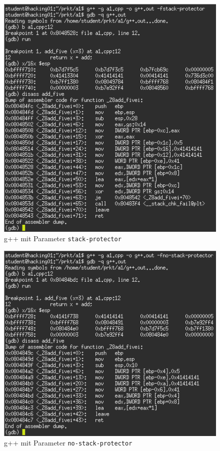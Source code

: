 \documentclass[11pt,a4paper]{article}
\begin{document}
\begin{figure}[h!]
  \caption{g++ mit Parameter \texttt{stack-protector}}
  \label{gpp0}
  \centering
    \includegraphics[scale=0.5]{2_gpp_protector_0.png}
\end{figure}
\begin{figure}[h!]
  \caption{g++ mit Parameter \texttt{no-stack-protector}}
  \label{gpp1}
  \centering
    \includegraphics[scale=0.5]{2_gpp_protector_1.png}
\end{figure}
\end{document}
